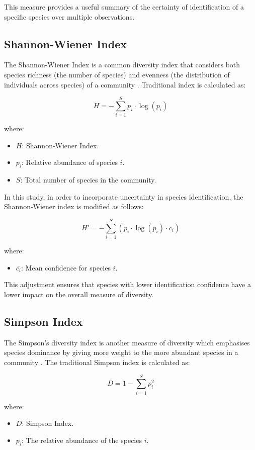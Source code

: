 \documentclass[a4paper,12pt]{article}
\begin{document}
This measure provides a useful summary of the certainty of identification of a specific species over multiple observations.

\subsection{Shannon-Wiener Index}
The Shannon-Wiener Index is a common diversity index that considers both species richness (the number of species) and evenness (the distribution of individuals across species) of a community \citep{magurran2013ecological}. Traditional index is calculated as:

\[
H = -\sum_{i=1}^{S} p_i \cdot \log(p_i)
\]

where:
\begin{itemize}
    \item $H$: Shannon-Wiener Index.
    \item $p_i$: Relative abundance of species $i$.
    \item $S$: Total number of species in the community.
\end{itemize}

In this study, in order to incorporate uncertainty in species identification, the Shannon-Wiener index is modified as follows:

\[
H' = -\sum_{i=1}^{S} \left( p_i \cdot \log(p_i) \cdot \bar{c_i} \right)
\]

where:
\begin{itemize}
    \item $\bar{c_i}$: Mean confidence for species $i$.
\end{itemize}

This adjustment ensures that species with lower identification confidence have a lower impact on the overall measure of diversity.

\subsection{Simpson Index}
The Simpson's diversity index is another measure of diversity which emphasises species dominance by giving more weight to the more abundant species in a community \citep{magurran2013ecological}. The traditional Simpson index is calculated as:

\[
D = 1 - \sum_{i=1}^{S} p_i^2
\]

where:
\begin{itemize}
    \item $D$: Simpson Index.
    \item $p_i$: The relative abundance of the species $i$.
\end{itemize}
\end{document}
